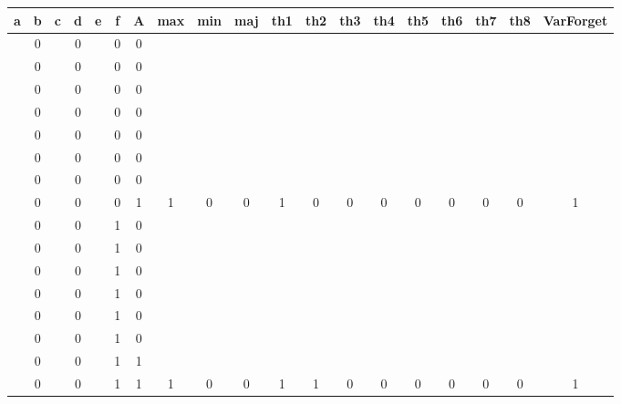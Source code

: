 \begin{table}[!tb]
    \centering
    \begin{tabular}{|c|c|c|c|c|c|c|c|c|c|c|c|c|c|c|c|c|c|c|}
        \hline
        \textbf{a} & \textbf{b} & \textbf{c} & \textbf{d} & \textbf{e} & \textbf{f} & \textbf{A} & \textbf{max} & \textbf{min} & \textbf{maj} & \textbf{th1} & \textbf{th2} & \textbf{th3} & \textbf{th4} & \textbf{th5} & \textbf{th6} & \textbf{th7} & \textbf{th8} & \textbf{VarForget} \\ \hline
        \rowcolor{gray!40}  & 0 &  & 0 &  & 0 & 0 &  &  &  &  &  &  &  &  &  &  &  &  \\ \hline
        \rowcolor{gray!40}  & 0 &  & 0 &  & 0 & 0 &  &  &  &  &  &  &  &  &  &  &  &  \\ \hline
        \rowcolor{gray!40}  & 0 &  & 0 &  & 0 & 0 &  &  &  &  &  &  &  &  &  &  &  &  \\ \hline
        \rowcolor{gray!40}  & 0 &  & 0 &  & 0 & 0 &  &  &  &  &  &  &  &  &  &  &  &  \\ \hline
        \rowcolor{gray!40}  & 0 &  & 0 &  & 0 & 0 &  &  &  &  &  &  &  &  &  &  &  &  \\ \hline
        \rowcolor{gray!40}  & 0 &  & 0 &  & 0 & 0 &  &  &  &  &  &  &  &  &  &  &  &  \\ \hline
        \rowcolor{gray!40}  & 0 &  & 0 &  & 0 & 0 &  &  &  &  &  &  &  &  &  &  &  &  \\ \hline
        \rowcolor{gray!40}  & 0 &  & 0 &  & 0 & 1 & 1 & 0 & 0 & 1 & 0 & 0 & 0 & 0 & 0 & 0 & 0 & 1 \\ \hline
        \rowcolor{blue!40}  & 0 &  & 0 &  & 1 & 0 &  &  &  &  &  &  &  &  &  &  &  &  \\ \hline
        \rowcolor{blue!40}  & 0 &  & 0 &  & 1 & 0 &  &  &  &  &  &  &  &  &  &  &  &  \\ \hline
        \rowcolor{blue!40}  & 0 &  & 0 &  & 1 & 0 &  &  &  &  &  &  &  &  &  &  &  &  \\ \hline
        \rowcolor{blue!40}  & 0 &  & 0 &  & 1 & 0 &  &  &  &  &  &  &  &  &  &  &  &  \\ \hline
        \rowcolor{blue!40}  & 0 &  & 0 &  & 1 & 0 &  &  &  &  &  &  &  &  &  &  &  &  \\ \hline
        \rowcolor{blue!40}  & 0 &  & 0 &  & 1 & 0 &  &  &  &  &  &  &  &  &  &  &  &  \\ \hline
        \rowcolor{blue!40}  & 0 &  & 0 &  & 1 & 1 &  &  &  &  &  &  &  &  &  &  &  &  \\ \hline
        \rowcolor{blue!40}  & 0 &  & 0 &  & 1 & 1 & 1 & 0 & 0 & 1 & 1 & 0 & 0 & 0 & 0 & 0 & 0 & 1 \\ \hline

\end{tabular}
\end{table}
